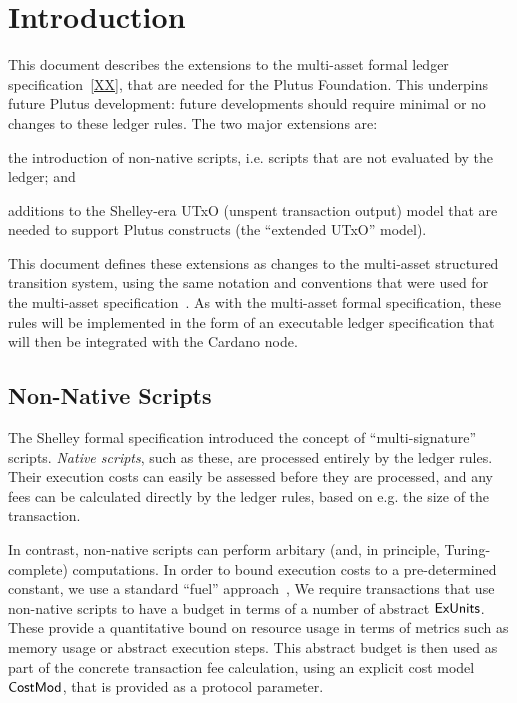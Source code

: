 \section{Introduction}

This document describes the extensions to the multi-asset formal ledger specification~\ref{XX},
that are needed for the Plutus Foundation.  This underpins future Plutus development: future developments should require minimal or no changes to these ledger rules.
%
The two major extensions are:
\begin{inparaenum}
\item
the introduction
of non-native scripts, i.e. scripts that are not evaluated by the ledger; and
\item
  additions to the Shelley-era UTxO (unspent transaction output) model that are needed to support Plutus
  constructs (the ``extended UTxO'' model).
\end{inparaenum}
This document defines these extensions as changes to the multi-asset structured transition system,
using the same notation and conventions that were used for the multi-asset specification~\cite{XX}.
As with the multi-asset formal specification, these rules will be implemented in the form of an executable ledger specification that will then be
integrated with the Cardano node.

\subsection{Non-Native Scripts}

The Shelley formal specification introduced the concept of ``multi-signature'' scripts.
\emph{Native scripts}, such as these, are processed entirely by the ledger rules.
Their execution costs can easily be assessed before they are processed,
and any fees can be calculated directly by the ledger rules, based on e.g. the
size of the transaction.

In contrast, non-native scripts can perform arbitary
(and, in principle, Turing-complete) computations.
In order to bound execution costs to a pre-determined constant, we use a standard ``fuel'' approach~\cite{XX},
We require transactions that use non-native scripts
to have a budget in terms of a number of abstract $\mathsf{ExUnits}$.
These provide a quantitative bound on resource usage in terms of metrics such as memory usage or abstract execution steps.
This abstract budget is then used as part of the concrete transaction fee calculation, using an explicit
cost model $\mathsf{CostMod}$, that is provided as a protocol parameter.

